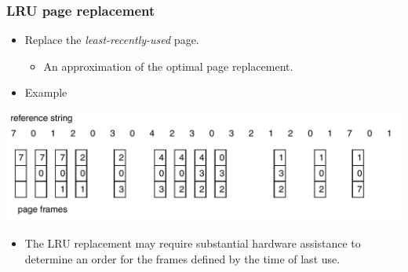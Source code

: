 \documentclass[CJKutf8,xcolor=pdftex,dvipsnames,table]{beamer}
\begin{document}
\begin{CJK*}{UTF8}{song}
  \begin{frame}
    \frametitle{LRU page replacement} \pause
    \begin{itemize}\parskip=0pt
    \item{Replace the \emph{least-recently-used} page.} \pause
      \begin{itemize}
      \item{An approximation of the optimal page replacement.} \pause
      \end{itemize}
    \item{Example} \pause
    \end{itemize}
    \begin{center}
      \includegraphics[scale=0.4]{v6f10-12} \pause
    \end{center}
    \begin{itemize}
    \item{The LRU replacement may require substantial hardware assistance to determine an order for the frames defined by the time of last use.}
    \end{itemize}
  \end{frame}
  

\end{CJK*}
\end{document}
